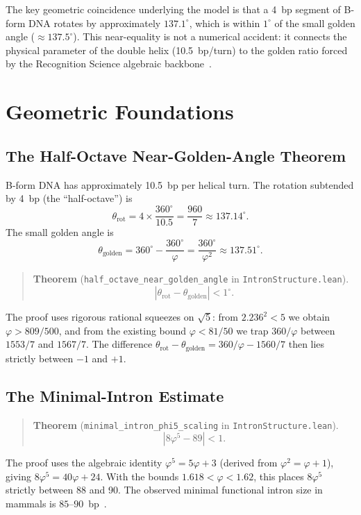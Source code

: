 \documentclass[11pt,twocolumn]{article}
\begin{document}
The key geometric coincidence underlying the model is that a 4~bp segment
of B-form DNA rotates by approximately $137.1^\circ$, which is within
$1^\circ$ of the small golden angle ($\approx 137.5^\circ$). This
near-equality is not a numerical accident: it connects the physical
parameter of the double helix (10.5~bp/turn) to the golden ratio forced by
the Recognition Science algebraic backbone~\cite{Washburn2025}.

\section{Geometric Foundations}

\subsection{The Half-Octave Near-Golden-Angle Theorem}

B-form DNA has approximately 10.5~bp per helical turn. The rotation
subtended by 4~bp (the ``half-octave'') is
\[
  \theta_{\mathrm{rot}} = 4 \times \frac{360^\circ}{10.5} =
  \frac{960}{7} \approx 137.14^\circ.
\]
The small golden angle is
\[
  \theta_{\mathrm{golden}} = 360^\circ - \frac{360^\circ}{\varphi} =
  \frac{360^\circ}{\varphi^2} \approx 137.51^\circ.
\]

\begin{quote}
\textbf{Theorem} (\texttt{half\_octave\_near\_golden\_angle} in
\texttt{IntronStructure.lean}).
\[
  |\theta_{\mathrm{rot}} - \theta_{\mathrm{golden}}| < 1^\circ.
\]
\end{quote}

The proof uses rigorous rational squeezes on $\sqrt{5}$: from
$2.236^2 < 5$ we obtain $\varphi > 809/500$, and from the existing bound
$\varphi < 81/50$ we trap $360/\varphi$ between $1553/7$ and $1567/7$.
The difference $\theta_{\mathrm{rot}} - \theta_{\mathrm{golden}} =
360/\varphi - 1560/7$ then lies strictly between $-1$ and $+1$.

\subsection{The Minimal-Intron Estimate}

\begin{quote}
\textbf{Theorem} (\texttt{minimal\_intron\_phi5\_scaling} in
\texttt{IntronStructure.lean}).
\[
  |8\varphi^5 - 89| < 1.
\]
\end{quote}

The proof uses the algebraic identity $\varphi^5 = 5\varphi + 3$
(derived from $\varphi^2 = \varphi + 1$), giving
$8\varphi^5 = 40\varphi + 24$. With the bounds $1.618 < \varphi < 1.62$,
this places $8\varphi^5$ strictly between 88 and 90. The observed minimal
functional intron size in mammals is $85$--$90$~bp~\cite{Yu2002}.
\end{document}

